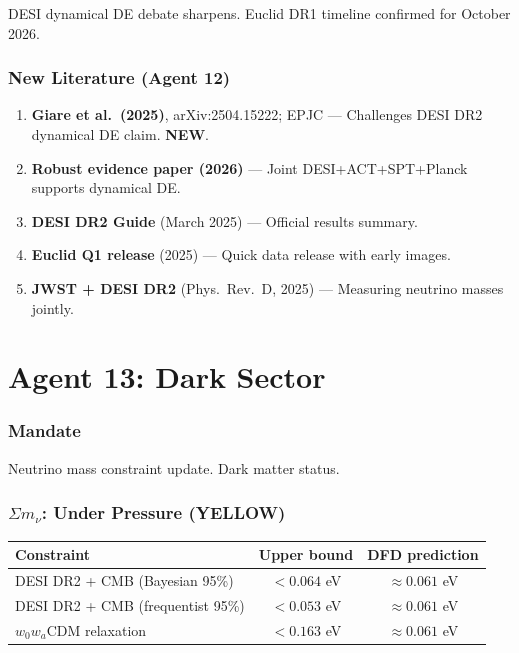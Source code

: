 \documentclass[11pt,a4paper]{article}
\newcommand{\YELLOW}{\textcolor{dfdyellow}{\textbf{YELLOW}}}
\newcommand{\NEW}{\textcolor{dfdblue}{\textbf{NEW}}}
\begin{document}
DESI dynamical DE debate sharpens. Euclid DR1 timeline confirmed for October 2026.

\section{New Literature (Agent 12)}

\begin{enumerate}
\item \textbf{Giare et al.\ (2025)}, arXiv:2504.15222; EPJC --- Challenges DESI DR2 dynamical DE claim. \NEW.
\item \textbf{Robust evidence paper (2026)} --- Joint DESI+ACT+SPT+Planck supports dynamical DE.
\item \textbf{DESI DR2 Guide} (March 2025) --- Official results summary.
\item \textbf{Euclid Q1 release} (2025) --- Quick data release with early images.
\item \textbf{JWST + DESI DR2} (Phys.\ Rev.\ D, 2025) --- Measuring neutrino masses jointly.
\end{enumerate}


\part{Agent 13: Dark Sector}
\label{part:agent13}

\section{Mandate}

Neutrino mass constraint update. Dark matter status.

\section{$\Sigma m_\nu$: Under Pressure (\YELLOW)}

\begin{center}
\begin{tabular}{lcc}
\toprule
\textbf{Constraint} & \textbf{Upper bound} & \textbf{DFD prediction} \\
\midrule
DESI DR2 + CMB (Bayesian 95\%) & $< 0.064$ eV & $\approx 0.061$ eV \\
DESI DR2 + CMB (frequentist 95\%) & $< 0.053$ eV & $\approx 0.061$ eV \\
$w_0 w_a$CDM relaxation & $< 0.163$ eV & $\approx 0.061$ eV \\
\bottomrule
\end{tabular}
\end{center}
\end{document}
